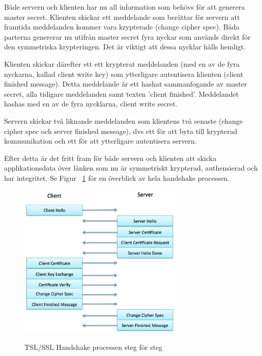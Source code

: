 Både servern och klienten har nu all information som behövs för att generera master secret. Klienten skickar ett meddelande som berättar för servern att framtida meddelanden kommer vara krypterade (change cipher spec). Båda parterna genererar nu utifrån master secret fyra nyckar som används direkt för den symmetriska krypteringen. Det är viktigt att dessa nycklar hålls hemligt.

Klienten skickar därefter ett ett krypterat meddelanden (med en av de fyra nyckarna, kallad client write key) som ytterligare autentisera klienten (client finished message). Detta meddelande är ett hashat sammanfogande av master secret, alla tidigare meddelanden samt texten 'client finished'. Meddelandet hashas med en av de fyra nycklarna, client write secret.

Servern skickar två liknande meddelanden som klientens två senaste (change cipher spec och server finished message), dvs ett för att byta till krypterad kommunikation och ett för att ytterligare autentisera servern.

Efter detta är det fritt fram för både servern och klienten att skicka applikationsdata över länken som nu är symmetriskt krypterad, authensierad och har integritet. Se Figur ~\ref{fig:handshake} för en överblick av hela handshake processen.

\begin{figure}[tbp]
        \caption{TSL/SSL Handshake processen steg för steg}
        \centering
                \includegraphics[width=0.7\textwidth]{ssl_handshake.png}
        \label{fig:handshake}
\end{figure}